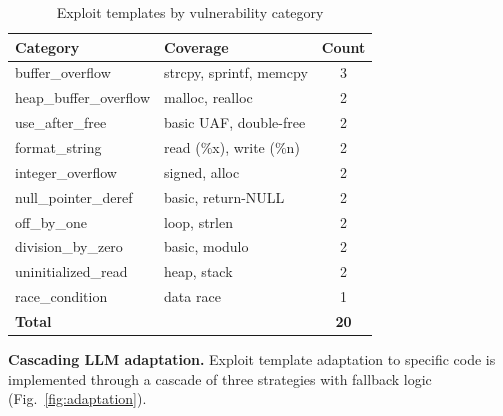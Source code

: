 \documentclass[runningheads]{llncs}
\begin{document}
\begin{table}
\centering
\caption{Exploit templates by vulnerability category}
\label{tab:templates}
\small
\begin{tabular}{|l|l|c|}
\hline
\textbf{Category} & \textbf{Coverage} & \textbf{Count} \\
\hline
buffer\_overflow & strcpy, sprintf, memcpy & 3 \\
heap\_buffer\_overflow & malloc, realloc & 2 \\
use\_after\_free & basic UAF, double-free & 2 \\
format\_string & read (\%x), write (\%n) & 2 \\
integer\_overflow & signed, alloc & 2 \\
null\_pointer\_deref & basic, return-NULL & 2 \\
off\_by\_one & loop, strlen & 2 \\
division\_by\_zero & basic, modulo & 2 \\
uninitialized\_read & heap, stack & 2 \\
race\_condition & data race & 1 \\
\hline
\textbf{Total} & & \textbf{20} \\
\hline
\end{tabular}
\end{table}

\textbf{Cascading LLM adaptation.} Exploit template adaptation to specific code is implemented through a cascade of three strategies with fallback logic (Fig.~\ref{fig:adaptation}).
\end{document}
